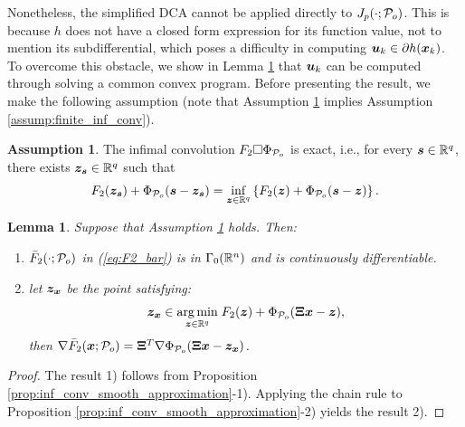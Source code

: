 \documentclass[lettersize,journal]{IEEEtran}
\theoremstyle{plain}%
\newtheorem{lemma}{Lemma}
\theoremstyle{definition}
\newtheorem{assumption}{Assumption}
\theoremstyle{remark}
\begin{document}
Nonetheless, the simplified DCA cannot be applied directly to $J_{p}(\cdot;\mathcal{P}_o)$. This is because $h$ does not have a closed form expression for its function value, not to mention its subdifferential, which poses a difficulty in computing $\bm{u}_k\in\partial h(\bm{x}_k)$. To overcome this obstacle, we show in Lemma \ref{lemma:nabla_bar_F2} that $\bm{u}_k$ can be computed through solving a common convex program. Before presenting the result, we make the following assumption (note that Assumption \ref{assump:exact_inf_conv} implies Assumption \ref{assump:finite_inf_conv}).

\begin{assumption}\label{assump:exact_inf_conv}
The infimal convolution $F_2\Box\Phi_{\mathcal{P}_o}$ is exact, i.e., for every $\bm{s}\in\mathbb{R}^q$, there exists $\bm{z}_{\bm{s}}\in\mathbb{R}^q$ such that
\begin{equation}
F_2(\bm{z}_{\bm{s}})+\Phi_{\mathcal{P}_o}(\bm{s}-\bm{z}_{\bm{s}})=\inf_{\bm{z}\in\mathbb{R}^q}\left\{ F_2(\bm{z})+\Phi_{\mathcal{P}_o}(\bm{s}-\bm{z}) \right\}.
\end{equation}
\end{assumption}

\begin{lemma}\label{lemma:nabla_bar_F2}
Suppose that Assumption \ref{assump:exact_inf_conv} holds. Then:
\begin{enumerate}
\item $\bar{F}_2(\cdot;\mathcal{P}_o)$ in (\ref{eq:F2_bar}) is in $\Gamma_0(\mathbb{R}^n)$ and is continuously differentiable.
\item let $\bm{z}_{\bm{x}}$ be the point satisfying:
\begin{equation}\label{eq:convex_program_in_nabla_F2}
\bm{z}_{\bm{x}}\in \underset{{\bm{z}\in\mathbb{R}^q}}{\mathrm{arg\,min}}\; F_2(\bm{z})+\Phi_{\mathcal{P}_o}(\bm{\Xi}\bm{x}-\bm{z}),
\end{equation}
then $\nabla \bar{F}_2(\bm{x};\mathcal{P}_o)=\bm{\Xi}^T\nabla \Phi_{\mathcal{P}_o}(\bm{\Xi}\bm{x}-\bm{z}_{\bm{x}})$.
\end{enumerate}
\end{lemma}
\begin{proof}
The result 1) follows from Proposition \ref{prop:inf_conv_smooth_approximation}-1). Applying the chain rule to Proposition \ref{prop:inf_conv_smooth_approximation}-2) yields the result 2).
\end{proof}
\end{document}
